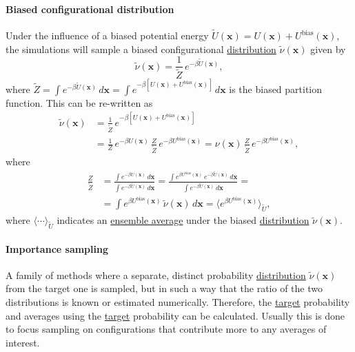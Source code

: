 \documentclass[9pt,review]{livecoms}
\newcommand{\vx}{\mathbf{x}}
\begin{document}
\hypertarget{ref:BiasedDist} {\paragraph{Biased configurational distribution}}
Under the influence of a biased potential energy $\tilde{U}(\vx) =  U(\vx) + U^\mathrm{bias}(\vx)$, the simulations will sample a biased configurational \hyperlink{ref:Distribution} {distribution} $\tilde{\nu}(\vx)$ given by
\begin{equation}
\label{eq:biased_configurational distribution}
\tilde{\nu}(\vx) = \frac{1}{\tilde{Z}} \, e^{-\beta \tilde{U}(\vx)},
\end{equation}
where $\tilde{Z} = \int e^{-\beta \tilde{U}(\vx)} \, d\vx = \int e^{-\beta\left [ U(\vx) + U^\mathrm{bias}(\vx) \right]} \, d\vx$ is the biased partition function.
This can be re-written as
\begin{align}
\label{eq:biased_x_distribtion_rewritten}
\tilde{\nu}(\vx) & =
\frac{1}{\tilde{Z}} \, e^{-\beta\left [ U(\vx) + U^\mathrm{bias}(\vx) \right]}
\nonumber \\
& =
\frac{1}{Z} \, e^{-\beta U(\vx)} \, \frac{Z}{\tilde{Z}} \, e^{-\beta U^\mathrm{bias}(\vx)} =
\nu(\vx) \, \frac{Z}{\tilde{Z}} \, e^{-\beta U^\mathrm{bias}(\vx)},
\end{align}
where
\begin{align}
\label{eq:fraction_of_partition_functions}
\frac{Z}{\tilde{Z}} & =
\frac{\int e^{-\beta U(\vx)} \, d\vx} {\int e^{-\beta \tilde{U}(\vx)} \, d\vx} =
\frac{\int  e^{\beta U^\mathrm{bias}(\vx)} \, e^{-\beta \tilde{U}(\vx)} \, d\vx} {\int e^{-\beta \tilde{U}(\vx)} \, d\vx} =
\nonumber \\
& =
\int  e^{\beta U^\mathrm{bias}(\vx)} \, \tilde{\nu}(\vx) \, d\vx =
\langle e^{\beta U^\mathrm{bias}(\vx)} \rangle_{\tilde U},
\end{align}
where $\langle \cdots \rangle_{\tilde U}$ indicates an \hyperlink{ref:ensemble_average} {ensemble average} under the biased \hyperlink{ref:Distribution} {distribution} $\tilde{\nu}(\vx)$.


\hypertarget{ref:IS} {\paragraph{Importance sampling}}
\label{sec:importance_sampling} A family of methods where a separate, distinct probability \hyperlink{ref:Distribution} {distribution} $\tilde\nu(\vx)$ from the target one is sampled, but in such a way that the ratio of the two distributions is known or estimated numerically. Therefore, the \hyperlink{ref:targetdist} {target} probability and averages using the \hyperlink{ref:targetdist} {target} probability can be calculated.  Usually this is done to focus sampling on configurations that contribute more to any averages of interest.
\end{document}
